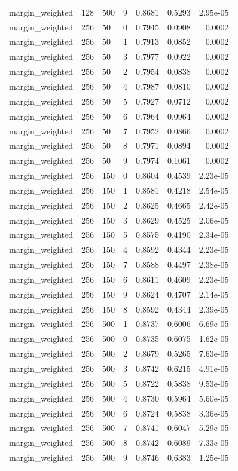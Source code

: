 \begin{footnotesize}
\begin{longtable}{lllrrrr}
margin\_weighted & 128 & 500 & 9 & 0.8681 & 0.5293 & 2.95e-05 \\
margin\_weighted & 256 & 50 & 0 & 0.7945 & 0.0908 & 0.0002 \\
margin\_weighted & 256 & 50 & 1 & 0.7913 & 0.0852 & 0.0002 \\
margin\_weighted & 256 & 50 & 3 & 0.7977 & 0.0922 & 0.0002 \\
margin\_weighted & 256 & 50 & 2 & 0.7954 & 0.0838 & 0.0002 \\
margin\_weighted & 256 & 50 & 4 & 0.7987 & 0.0810 & 0.0002 \\
margin\_weighted & 256 & 50 & 5 & 0.7927 & 0.0712 & 0.0002 \\
margin\_weighted & 256 & 50 & 6 & 0.7964 & 0.0964 & 0.0002 \\
margin\_weighted & 256 & 50 & 7 & 0.7952 & 0.0866 & 0.0002 \\
margin\_weighted & 256 & 50 & 8 & 0.7971 & 0.0894 & 0.0002 \\
margin\_weighted & 256 & 50 & 9 & 0.7974 & 0.1061 & 0.0002 \\
margin\_weighted & 256 & 150 & 0 & 0.8604 & 0.4539 & 2.23e-05 \\
margin\_weighted & 256 & 150 & 1 & 0.8581 & 0.4218 & 2.54e-05 \\
margin\_weighted & 256 & 150 & 2 & 0.8625 & 0.4665 & 2.42e-05 \\
margin\_weighted & 256 & 150 & 3 & 0.8629 & 0.4525 & 2.06e-05 \\
margin\_weighted & 256 & 150 & 5 & 0.8575 & 0.4190 & 2.34e-05 \\
margin\_weighted & 256 & 150 & 4 & 0.8592 & 0.4344 & 2.23e-05 \\
margin\_weighted & 256 & 150 & 7 & 0.8588 & 0.4497 & 2.38e-05 \\
margin\_weighted & 256 & 150 & 6 & 0.8611 & 0.4609 & 2.23e-05 \\
margin\_weighted & 256 & 150 & 9 & 0.8624 & 0.4707 & 2.14e-05 \\
margin\_weighted & 256 & 150 & 8 & 0.8592 & 0.4344 & 2.39e-05 \\
margin\_weighted & 256 & 500 & 1 & 0.8737 & 0.6006 & 6.69e-05 \\
margin\_weighted & 256 & 500 & 0 & 0.8735 & 0.6075 & 1.62e-05 \\
margin\_weighted & 256 & 500 & 2 & 0.8679 & 0.5265 & 7.63e-05 \\
margin\_weighted & 256 & 500 & 3 & 0.8742 & 0.6215 & 4.91e-05 \\
margin\_weighted & 256 & 500 & 5 & 0.8722 & 0.5838 & 9.53e-05 \\
margin\_weighted & 256 & 500 & 4 & 0.8730 & 0.5964 & 5.60e-05 \\
margin\_weighted & 256 & 500 & 6 & 0.8724 & 0.5838 & 3.36e-05 \\
margin\_weighted & 256 & 500 & 7 & 0.8741 & 0.6047 & 5.29e-05 \\
margin\_weighted & 256 & 500 & 8 & 0.8742 & 0.6089 & 7.33e-05 \\
margin\_weighted & 256 & 500 & 9 & 0.8746 & 0.6383 & 1.25e-05 \\
\end{longtable}\end{footnotesize}
